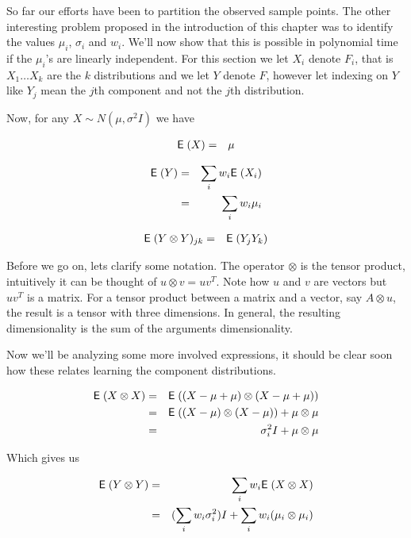 \documentclass{book}
\numberwithin{exercise}{chapter}
\begin{document}
So far our efforts have been to partition the observed sample points.
The other interesting problem proposed in the introduction of this
chapter was to identify the values $\mu_i$, $\sigma_i$ and $w_i$. We'll
now show that this is possible in polynomial time if the $\mu_i$'s are
linearly independent. For this section we let $X_i$ denote $F_i$,
that is $X_1 \dots X_k$ are the $k$ distributions and we let $Y$ denote
$F$, however let indexing on $Y$ like $Y_j$ mean the $j$th component and
not the $j$th distribution.

Now, for any $X \sim N(\mu, \sigma^2 I)$ we have

\begin{eqnarray*}
  \hbox{{\sf E}\;}(X) &=& \mu
\end{eqnarray*}

\begin{eqnarray*}
  \hbox{{\sf E}\;}(Y)
  &=& \sum_i w_i \hbox{{\sf E}\;}(X_i) \\
  &=& \sum_i w_i \mu_i
\end{eqnarray*}

\begin{eqnarray*}
  \hbox{{\sf E}\;}(Y \otimes Y)_{j k}
  &=& \hbox{{\sf E}\;}(Y_j Y_k)
\end{eqnarray*}

Before we go on, lets clarify some notation. The operator $\otimes$ is
the tensor product, intuitively it can be thought of $ u \otimes v = u
v^T $. Note how $u$ and $v$ are vectors but $u v^T$ is a matrix. For a
tensor product between a matrix and a vector, say $A \otimes u$, the
result is a tensor with three dimensions. In general, the resulting
dimensionality is the sum of the arguments dimensionality.

Now we'll be analyzing some more involved expressions, it should be clear
soon how these relates learning the component distributions.

\begin{eqnarray*}
  \hbox{{\sf E}\;}(X \otimes X)
  &=& \hbox{{\sf E}\;}((X-\mu+\mu) \otimes (X-\mu+\mu)) \\
  &=& \hbox{{\sf E}\;}((X-\mu) \otimes (X-\mu)) + \mu \otimes \mu \\
  &=& \sigma_i^2 I + \mu \otimes \mu
\end{eqnarray*}

Which gives us

\begin{eqnarray*}
  \hbox{{\sf E}\;}(Y \otimes Y)
  &=& \sum_i w_i \hbox{{\sf E}\;}(X \otimes X) \\
  &=& (\sum_i w_i \sigma_i^2) I + \sum_i w_i (\mu_i \otimes \mu_i)
\end{eqnarray*}
\end{document}
